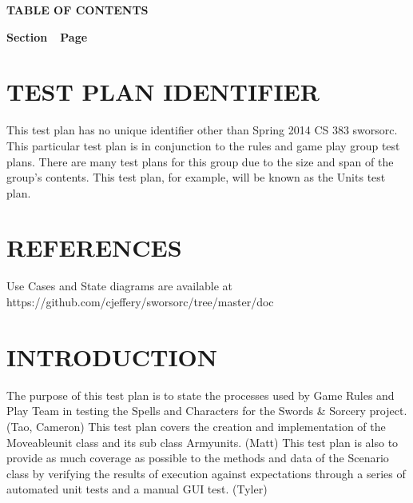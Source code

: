 {\centering{}\bfseries\color{black}
TABLE OF CONTENTS
\par}

{\bfseries\color{black}
Section\ \ Page}

\setcounter{tocdepth}{9}
\renewcommand\contentsname{}
\tableofcontents

\setcounter{page}{1}\pagestyle{Convertiv}

\section[IDENTIFIER]{\bfseries\color{black} TEST PLAN IDENTIFIER}

{\color{black}
This test plan has no unique identifier other than Spring 2014 CS 383 sworsorc. This particular test plan is in conjunction to the rules and game play group test plans. There are many test plans for this group due to the size and span of the group's contents. This test plan, for example, will be known as the Units test plan.}

\section[REFERENCES]{\bfseries\color{black}
REFERENCES}

{\color{black}
Use Cases and State diagrams are available at https://github.com/cjeffery/sworsorc/tree/master/doc }


\section[INTRODUCTION]{\bfseries\color{black} INTRODUCTION}

{\color{black}
The purpose of this test plan is to state the processes used by Game Rules and Play Team in testing the Spells and Characters for the Swords \& Sorcery project.(Tao, Cameron)
\newline
\newline
This test plan covers the creation and implementation of the Moveableunit class and its sub class Armyunits. (Matt)
\newline
\newline
This test plan is also to provide as much coverage as possible to the methods and data of the Scenario class by verifying the results of execution against expectations through a series of automated unit tests and a manual GUI test. (Tyler)
}

